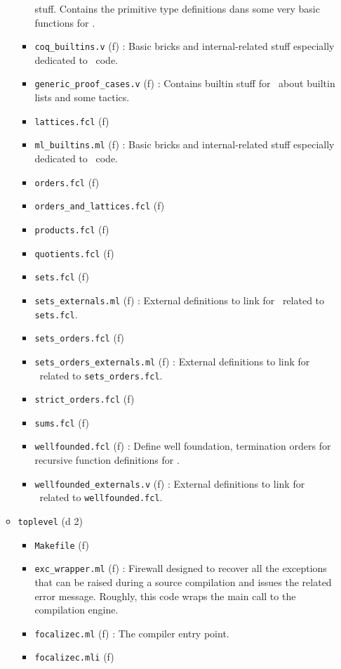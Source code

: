 \begin{itemize}
\begin{itemize}
\begin{itemize}
      stuff. Contains the primitive type definitions dans some very
      basic functions for \focalize.
    \item {\tt coq\_builtins.v} (f) : Basic bricks and internal-related
      stuff especially dedicated to \coq\ code.
    \item {\tt generic\_proof\_cases.v} (f) : Contains builtin stuff
      for \coq\ about builtin lists and some tactics.
    \item {\tt lattices.fcl} (f)
    \item {\tt ml\_builtins.ml} (f) : Basic bricks and internal-related
      stuff especially dedicated to \ocaml\ code.
    \item {\tt orders.fcl} (f)
    \item {\tt orders\_and\_lattices.fcl} (f)
    \item {\tt products.fcl} (f)
    \item {\tt quotients.fcl} (f)
    \item {\tt sets.fcl} (f)
    \item {\tt sets\_externals.ml} (f) : External definitions to link
      for \ocaml\ related to {\tt sets.fcl}.
    \item {\tt sets\_orders.fcl} (f)
    \item {\tt sets\_orders\_externals.ml} (f) : External definitions
      to link for \ocaml\ related to {\tt sets\_orders.fcl}.
    \item {\tt strict\_orders.fcl} (f)
    \item {\tt sums.fcl} (f)
    \item {\tt wellfounded.fcl} (f) : Define well foundation,
      termination orders for recursive function definitions for \coq.
    \item {\tt wellfounded\_externals.v} (f) : External definitions
      to link for \ocaml\ related to {\tt wellfounded.fcl}.
    \end{itemize}
  \item {\tt toplevel} (d 2)
    \begin{itemize}
    \item {\tt Makefile} (f)
    \item {\tt exc\_wrapper.ml} (f) : Firewall designed to recover all
      the exceptions that can be raised during a source compilation
      and issues the related error message. Roughly, this code wraps
      the main call to the compilation engine.
    \item {\tt focalizec.ml} (f) : The compiler entry point.
    \item {\tt focalizec.mli} (f)

\end{itemize}
\end{itemize}
\end{itemize}
